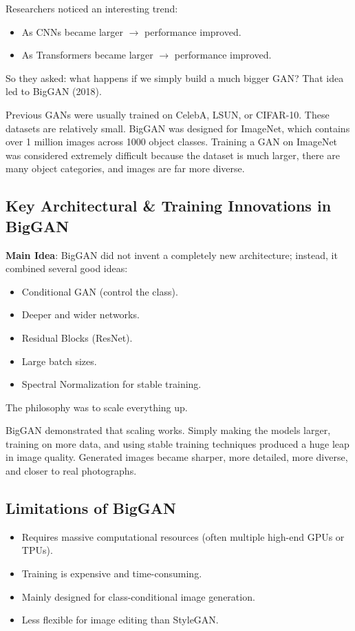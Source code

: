 Researchers noticed an interesting trend:
\begin{itemize}
    \item As CNNs became larger $\longrightarrow$ performance improved.
    \item As Transformers became larger $\longrightarrow$ performance improved.
\end{itemize}
So they asked: what happens if we simply build a much bigger GAN? That idea led to BigGAN (2018).

Previous GANs were usually trained on CelebA, LSUN, or CIFAR-10. These datasets are relatively small. BigGAN was designed for ImageNet, which contains over 1 million images across 1000 object classes. Training a GAN on ImageNet was considered extremely difficult because the dataset is much larger, there are many object categories, and images are far more diverse.

\subsection*{Key Architectural \& Training Innovations in BigGAN}

\textbf{Main Idea}: BigGAN did not invent a completely new architecture; instead, it combined several good ideas:
\begin{itemize}
    \item Conditional GAN (control the class).
    \item Deeper and wider networks.
    \item Residual Blocks (ResNet).
    \item Large batch sizes.
    \item Spectral Normalization for stable training.
\end{itemize}
The philosophy was to scale everything up.

BigGAN demonstrated that scaling works. Simply making the models larger, training on more data, and using stable training techniques produced a huge leap in image quality. Generated images became sharper, more detailed, more diverse, and closer to real photographs.

\subsection*{Limitations of BigGAN}
\begin{itemize}
    \item Requires massive computational resources (often multiple high-end GPUs or TPUs).
    \item Training is expensive and time-consuming.
    \item Mainly designed for class-conditional image generation.
    \item Less flexible for image editing than StyleGAN.
\end{itemize}

